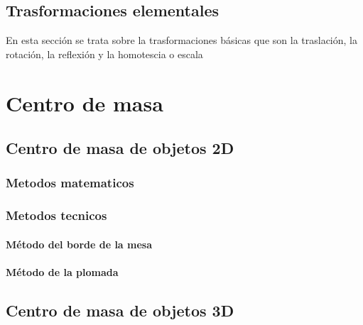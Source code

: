 \documentclass[16pt,]{krantz}
\theoremstyle{definition}
\theoremstyle{definition}
\theoremstyle{definition}
\theoremstyle{definition}
\theoremstyle{remark}
\begin{document}
\hypertarget{trasformaciones-elementales}{%
\section{Trasformaciones elementales}\label{trasformaciones-elementales}}

En esta sección se trata sobre la trasformaciones básicas que son la traslación, la rotación, la reflexión y la homotescia o escala

\hypertarget{centro-de-masa}{%
\chapter{Centro de masa}\label{centro-de-masa}}

\hypertarget{centro-de-masa-de-objetos-2d}{%
\section{Centro de masa de objetos 2D}\label{centro-de-masa-de-objetos-2d}}

\hypertarget{metodos-matematicos}{%
\subsection{Metodos matematicos}\label{metodos-matematicos}}

\hypertarget{metodos-tecnicos}{%
\subsection{Metodos tecnicos}\label{metodos-tecnicos}}

\hypertarget{muxe9todo-del-borde-de-la-mesa}{%
\subsubsection{Método del borde de la mesa}\label{muxe9todo-del-borde-de-la-mesa}}

\hypertarget{muxe9todo-de-la-plomada}{%
\subsubsection{Método de la plomada}\label{muxe9todo-de-la-plomada}}

\hypertarget{centro-de-masa-de-objetos-3d}{%
\section{Centro de masa de objetos 3D}\label{centro-de-masa-de-objetos-3d}}
\end{document}
